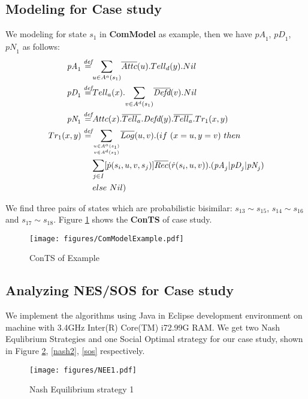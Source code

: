 \documentclass{acm_proc_article-sp}
\begin{document}
\subsection{Modeling for Case study}
We modeling for state $s_1$ in \textbf{ComModel} as example, then we have $\textit{pA}_1$, $\textit{pD}_1$, $\textit{pN}_1$ as follows:
\begin{align*}
\textit{pA}_1 \stackrel{\textit{def}}{=}&  \underset{u\in A^a(s_1)}{\sum}\overline{Attc}(u).Tell_d(y).Nil \\
\textit{pD}_1  \stackrel{\textit{def}}{=}&  Tell_a(x).\underset{v\in A^d(s_1)}{\sum}\overline{\textit{Defd}}(v).Nil\\
\textit{pN}_1  \stackrel{\textit{def}}{=}&  Attc(x).\overline{Tell_a}.\textit{Defd}(y).\overline{Tell_a}.Tr_{1}(x,y)\\
Tr_{1}(x,y)  \stackrel{\textit{def}}{=}& \underset{u\in A^a(s_1)\atop v\in A^d(s_1)}{\sum}\overline{Log}(u,v).(if~(x=u,y=v)~ then\\
&  \underset{j\in I}{\sum}[\dot{p}(s_i,u,v,s_j)]\overline{Rec}(\dot{r}(s_i,u,v)). (\textit{pA}_j|\textit{pD}_j|\textit{pN}_j)\\
&  else~Nil)
\end{align*}

We find three pairs of states which are probabilistic bisimilar: $s_{13}\sim s_{15}$, $s_{14}\sim s_{16}$ and $s_{17}\sim s_{18}$. Figure \ref{ComModelcasestudy} shows the \textbf{ConTS} of case study.

\begin{figure}[htpb]
\begin{center}
\texttt{[image: figures/ComModelExample.pdf]}
\caption{ConTS of Example}
\label{ComModelcasestudy}
\end{center}
\end{figure}

\subsection{Analyzing NES/SOS for Case study}
We implement the algorithms using Java in Eclipse development environment on machine with 3.4GHz Inter(R) Core(TM) i72.99G RAM.
We get two Nash Equlibrium Strategies and one Social Optimal strategy for our case study, shown in Figure \ref{nash1}, \ref{nash2}, \ref{sos}  respectively.
\begin{figure}[!htb]
\begin{center}
\texttt{[image: figures/NEE1.pdf]}
\caption{Nash Equilibrium strategy 1}
\label{nash1}
\end{center}
\end{figure}
\end{document}
